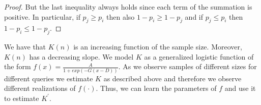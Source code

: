 \documentclass{vldb}
\begin{document}
\begin{appendix}
\begin{proof}
But the last inequality always holds since each term of the summation is positive. In particular, if $p_j \geq p_i$ then
also $1-p_i \geq 1-p_j$ and if $p_j \leq p_i$ then $1-p_i \leq 1-p_j$.
\end{proof}

We have that $K(n)$ is an increasing function of the sample size. Moreover, $K(n)$ has a decreasing slope. We model $K$ as a generalized logistic function of the form $f(x) = \frac{A}{1+exp(-G(x-D))}$. As we observe samples of different sizes for different queries we estimate $K$ as described above and therefore we observe different realizations of $f(\cdot)$. Thus, we can learn the parameters of $f$ and use it to estimate $K^{\prime}$.
\end{appendix}
\end{document}
